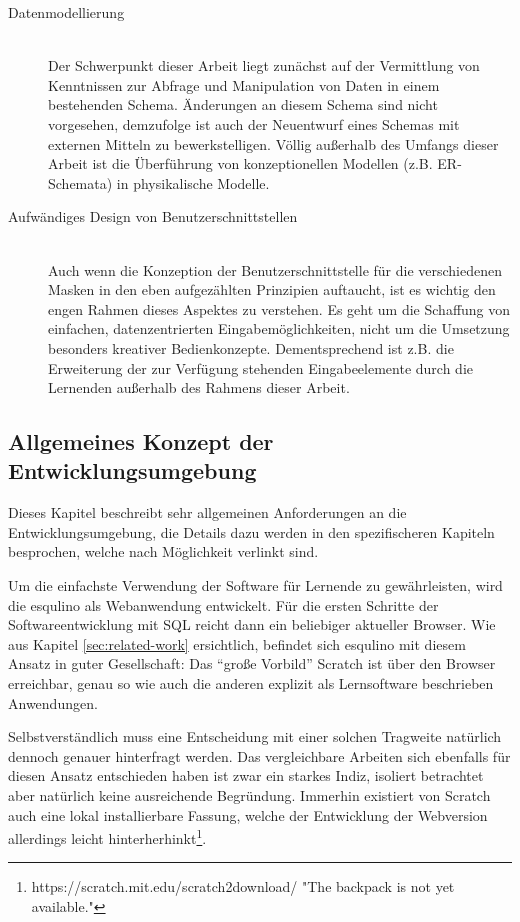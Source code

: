 \begin{description}
\item[Datenmodellierung] \hfill \\
  Der Schwerpunkt dieser Arbeit liegt zunächst auf der Vermittlung von Kenntnissen zur Abfrage und Manipulation von Daten in einem bestehenden Schema. Änderungen an diesem Schema sind nicht vorgesehen, demzufolge ist auch der Neuentwurf eines Schemas mit externen Mitteln zu bewerkstelligen. Völlig außerhalb des Umfangs dieser Arbeit ist die Überführung von konzeptionellen Modellen (z.B. ER-Schemata) in physikalische Modelle.
\item[Aufwändiges Design von Benutzerschnittstellen] \hfill \\
  Auch wenn die Konzeption der Benutzerschnittstelle für die verschiedenen Masken in den eben aufgezählten Prinzipien auftaucht, ist es wichtig den engen Rahmen dieses Aspektes zu verstehen. Es geht um die Schaffung von einfachen, datenzentrierten Eingabemöglichkeiten, nicht um die Umsetzung besonders kreativer Bedienkonzepte. Dementsprechend ist z.B. die Erweiterung der zur Verfügung stehenden Eingabeelemente durch die Lernenden außerhalb des Rahmens dieser Arbeit.
\end{description}

\subsection{Allgemeines Konzept der Entwicklungsumgebung}
\label{sec:design-general-concept}

Dieses Kapitel beschreibt sehr allgemeinen Anforderungen an die Entwicklungsumgebung, die Details dazu werden in den spezifischeren Kapiteln besprochen, welche nach Möglichkeit verlinkt sind.

Um die einfachste Verwendung der Software für Lernende zu gewährleisten, wird die esqulino als Webanwendung entwickelt. Für die ersten Schritte der Softwareentwicklung mit SQL reicht dann ein beliebiger aktueller Browser. Wie aus Kapitel \ref{sec:related-work}  ersichtlich, befindet sich esqulino mit diesem Ansatz in guter Gesellschaft: Das ``große Vorbild'' Scratch ist über den Browser erreichbar, genau so wie auch die anderen explizit als Lernsoftware beschrieben Anwendungen.

Selbstverständlich muss eine Entscheidung mit einer solchen Tragweite natürlich dennoch genauer hinterfragt werden. Das vergleichbare Arbeiten sich ebenfalls für diesen Ansatz entschieden haben ist zwar ein starkes Indiz, isoliert betrachtet aber natürlich keine ausreichende Begründung. Immerhin existiert von Scratch auch eine lokal installierbare Fassung, welche der Entwicklung der Webversion allerdings leicht hinterherhinkt\footnote{https://scratch.mit.edu/scratch2download/ "The backpack is not yet available."}.

